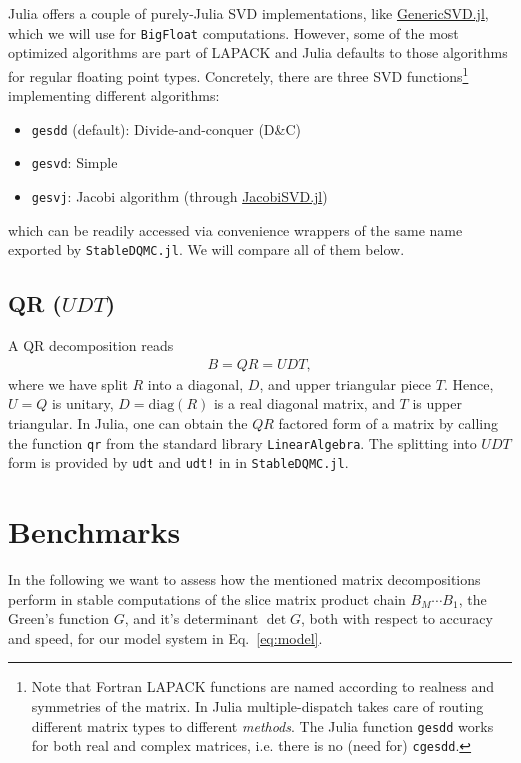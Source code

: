\documentclass[%
 reprint,
superscriptaddress,
citeautoscript,
showpacs,
 amsmath,amssymb,
 aps,
 prb,
longbibliography,
]{revtex4-1}
\begin{document}
Julia offers a couple of purely-Julia SVD implementations, like \href{https://github.com/JuliaLinearAlgebra/GenericSVD.jl/}{GenericSVD.jl}, which we will use for \texttt{BigFloat} computations. However, some of the most optimized algorithms are part of LAPACK\cite{LAPACK} and Julia defaults to those algorithms for regular floating point types. Concretely, there are three SVD functions\footnote{Note that Fortran LAPACK functions are named according to realness and symmetries of the matrix. In Julia multiple-dispatch takes care of routing different matrix types to different \textit{methods}. The Julia function \texttt{gesdd} works for both real and complex matrices, i.e. there is no (need for) \texttt{cgesdd}.} implementing different algorithms:
\begin{itemize}
	\item \texttt{gesdd} (default): Divide-and-conquer (D\&C)
	\item \texttt{gesvd}: Simple
	\item \texttt{gesvj}: Jacobi algorithm (through \href{https://github.com/RalphAS/JacobiSVD.jl}{JacobiSVD.jl})
\end{itemize}
which can be readily accessed via convenience wrappers of the same name exported by \texttt{StableDQMC.jl}. We will compare all of them below.

\subsection{QR ($UDT$)}
A QR decomposition reads
\begin{align}
B = QR = UDT,
\end{align}
where we have split $R$ into a diagonal, $D$, and upper triangular piece $T$. Hence, $U = Q$ is unitary, $D = \textrm{diag}(R)$ is a real diagonal matrix, and $T$ is upper triangular. In Julia, one can obtain the $QR$ factored form of a matrix by calling the function \texttt{qr} from the standard library \texttt{LinearAlgebra}. The splitting into $UDT$ form is provided by \texttt{udt} and \texttt{udt!} in in \texttt{StableDQMC.jl}.

\section{Benchmarks}

In the following we want to assess how the mentioned matrix decompositions perform in stable computations of the slice matrix product chain $B_M \cdots B_1$, the Green's function $G$, and it's determinant $\det G$, both with respect to accuracy and speed, for our model system in Eq.~\ref{eq:model}.
\end{document}
